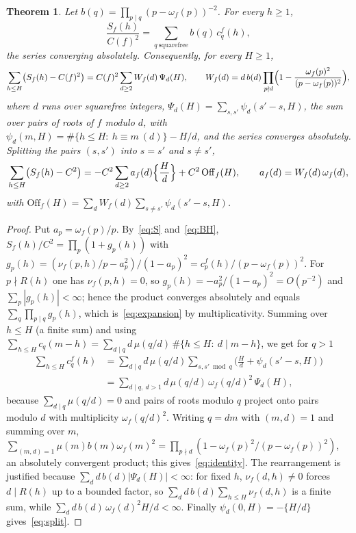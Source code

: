 \documentclass[11pt,a4paper]{article}
\newtheorem{theorem}{Theorem}
\theoremstyle{remark}\newtheorem{remark}[theorem]{Remark}
\begin{document}
\begin{theorem}\label{thm:expansion}
Let $b(q)=\prod_{p\mid q}(p-\omega_f(p))^{-2}$. For every $h\ge1$,
\begin{equation}\label{eq:expansion}
\frac{S_f(h)}{C(f)^2}=\sum_{q\ \mathrm{squarefree}}b(q)\,c^f_q(h),
\end{equation}
the series converging absolutely. Consequently, for every $H\ge1$,
\begin{equation}\label{eq:identity}
\sum_{h\le H}\bigl(S_f(h)-C(f)^2\bigr)=C(f)^2\sum_{d\ge2}W_f(d)\,\Psi_d(H),\qquad
W_f(d)=d\,b(d)\prod_{p\nmid d}\Bigl(1-\frac{\omega_f(p)^2}{(p-\omega_f(p))^2}\Bigr),
\end{equation}
where $d$ runs over squarefree integers,
$\Psi_d(H)=\sum_{s,s'}\psi_d(s'-s,H)$, the sum over pairs of roots of $f$ modulo $d$, with
$\psi_d(m,H)=\#\{h\le H:\ h\equiv m\ (d)\}-H/d$, and the series converges absolutely.
Splitting the pairs $(s,s')$ into $s=s'$ and $s\ne s'$,
\begin{equation}\label{eq:split}
\sum_{h\le H}\bigl(S_f(h)-C^2\bigr)=-C^2\sum_{d\ge2}a_f(d)\Bigl\{\frac Hd\Bigr\}+C^2\,\mathrm{Off}_f(H),
\qquad a_f(d)=W_f(d)\,\omega_f(d),
\end{equation}
with $\mathrm{Off}_f(H)=\sum_{d}W_f(d)\sum_{s\ne s'}\psi_d(s'-s,H)$.
\end{theorem}

\begin{proof}
Put $a_p=\omega_f(p)/p$. By~\eqref{eq:S} and~\eqref{eq:BH},
$S_f(h)/C^2=\prod_p(1+g_p(h))$ with
$g_p(h)=(\nu_f(p,h)/p-a_p^2)/(1-a_p)^2=c^f_p(h)/(p-\omega_f(p))^2$. For $p\nmid R(h)$ one has
$\nu_f(p,h)=0$, so $g_p(h)=-a_p^2/(1-a_p)^2=O(p^{-2})$ and $\sum_p|g_p(h)|<\infty$; hence the product
converges absolutely and equals $\sum_q\prod_{p\mid q}g_p(h)$, which is~\eqref{eq:expansion} by
multiplicativity. Summing over $h\le H$ (a finite sum) and using
$\sum_{h\le H}c_q(m-h)=\sum_{d\mid q}d\,\mu(q/d)\,\#\{h\le H:\ d\mid m-h\}$, we get for $q>1$
\[
\begin{aligned}
\sum_{h\le H}c^f_q(h)&=\sum_{d\mid q}d\,\mu(q/d)\sum_{s,s'\bmod q}\bigl(\tfrac Hd+\psi_d(s'-s,H)\bigr)\\
&=\sum_{d\mid q,\ d>1}d\,\mu(q/d)\,\omega_f(q/d)^2\,\Psi_d(H),
\end{aligned}
\]
because $\sum_{d\mid q}\mu(q/d)=0$ and pairs of roots modulo $q$ project onto pairs modulo $d$ with
multiplicity $\omega_f(q/d)^2$. Writing $q=dm$ with $(m,d)=1$ and summing over $m$,
$\sum_{(m,d)=1}\mu(m)b(m)\omega_f(m)^2=\prod_{p\nmid d}(1-\omega_f(p)^2/(p-\omega_f(p))^2)$, an
absolutely convergent product; this gives~\eqref{eq:identity}. The rearrangement is justified because
$\sum_d d\,b(d)|\Psi_d(H)|<\infty$: for fixed $h$, $\nu_f(d,h)\ne0$ forces $d\mid R(h)$ up to a bounded
factor, so $\sum_d d\,b(d)\sum_{h\le H}\nu_f(d,h)$ is a finite sum, while
$\sum_d d\,b(d)\,\omega_f(d)^2H/d<\infty$. Finally $\psi_d(0,H)=-\{H/d\}$ gives~\eqref{eq:split}.
\end{proof}
\end{document}
